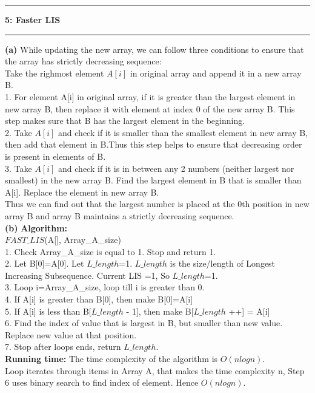 \documentclass[11pt]{article}
\newcommand\question[2]{\vspace{.25in}\hrule\textbf{#1: #2}\vspace{.5em}\hrule\vspace{.10in}}
\renewcommand\part[1]{\vspace{.10in}\textbf{(#1)}}
\newcommand\algorithm{\vspace{.10in}\textbf{Algorithm: }}
\newcommand\runtime{\vspace{.10in}\textbf{Running time: }}
\begin{document}
\question{5}{Faster LIS}
\part{a} While updating the new array, we can follow three conditions to ensure that the array has strictly decreasing sequence:\\
Take the righmost element $A[i]$ in original array and append it in a new array B.\\
1. For element A[i] in original array, if it is greater than the largest element in new array B, then replace it with element at index 0 of the new array B. This step makes sure that B has the largest element in the beginning.\\
2. Take $A[i]$ and check if it is smaller than the smallest element in new array B, then add that element in B.Thus this step helps to ensure that decreasing order is present in elements of B.\\
3. Take $A[i]$ and check if it is in between any 2 numbers (neither largest nor smallest) in the new array B. Find the largest element in B that is smaller than A[i]. Replace the element in new array B.\\
Thus we can find out that the largest number is placed at the $0$th position in new array B and array B maintains a strictly decreasing sequence.\\
\part{b}
\algorithm\\
$FAST\_LIS$(A[], Array\_A\_size)\\
1. Check Array\_A\_size is equal to 1. Stop and return 1.\\
2. Let B[0]=A[0]. Let $L\_length$=1. $L\_length$ is the size/length of Longest Increasing Subsequence. Current LIS =1, So $L\_length$=1.\\
3. Loop i=Array\_A\_size, loop till i is greater than 0.\\
4. If A[i] is greater than B[0], then make B[0]=A[i]\\
5. If A[i] is less than B[$L\_length$ - 1], then make B[$L\_length$ ++] = A[i]\\
6. Find the index of value that is largest in B, but smaller than new value. Replace new value at that position.\\
7. Stop after loops ends, return $L\_length$.\\

\runtime The time complexity of the algorithm is $O(nlogn)$.\\
Loop iterates through items in Array A, that makes the time complexity n, Step 6 uses binary search to find index of element. Hence $O(nlogn)$.\\
\end{document}
